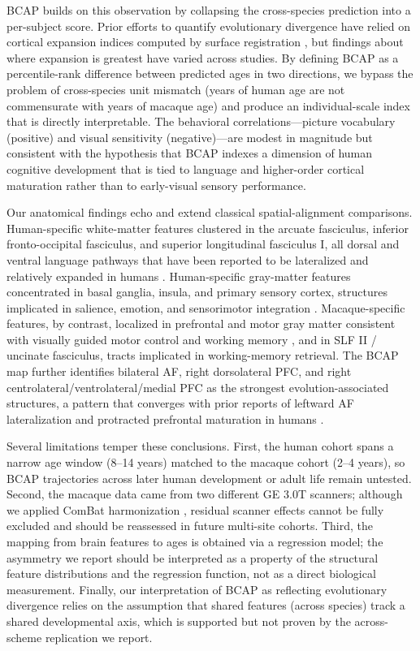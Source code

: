 \documentclass[11pt]{article}
\begin{document}
BCAP builds on this observation by collapsing the cross-species prediction into a per-subject score. Prior efforts to quantify evolutionary divergence have relied on cortical expansion indices computed by surface registration \citep{hill2010similar, smaers2019brain}, but findings about where expansion is greatest have varied across studies. By defining BCAP as a percentile-rank difference between predicted ages in two directions, we bypass the problem of cross-species unit mismatch (years of human age are not commensurate with years of macaque age) and produce an individual-scale index that is directly interpretable. The behavioral correlations---picture vocabulary (positive) and visual sensitivity (negative)---are modest in magnitude but consistent with the hypothesis that BCAP indexes a dimension of human cognitive development that is tied to language and higher-order cortical maturation rather than to early-visual sensory performance.

Our anatomical findings echo and extend classical spatial-alignment comparisons. Human-specific white-matter features clustered in the arcuate fasciculus, inferior fronto-occipital fasciculus, and superior longitudinal fasciculus I, all dorsal and ventral language pathways that have been reported to be lateralized and relatively expanded in humans \citep{rilling2008evolution, rilling2012continuity, eichert2019special, balezeau2020primate, catani2008arcuate}. Human-specific gray-matter features concentrated in basal ganglia, insula, and primary sensory cortex, structures implicated in salience, emotion, and sensorimotor integration \citep{menon2010saliency}. Macaque-specific features, by contrast, localized in prefrontal and motor gray matter consistent with visually guided motor control and working memory \citep{smaers2011primate}, and in SLF II / uncinate fasciculus, tracts implicated in working-memory retrieval. The BCAP map further identifies bilateral AF, right dorsolateral PFC, and right centrolateral/ventrolateral/medial PFC as the strongest evolution-associated structures, a pattern that converges with prior reports of leftward AF lateralization and protracted prefrontal maturation in humans \citep{miller2012prolonged, smaers2011primate, patel2019temporoparietal}.

Several limitations temper these conclusions. First, the human cohort spans a narrow age window (8--14 years) matched to the macaque cohort (2--4 years), so BCAP trajectories across later human development or adult life remain untested. Second, the macaque data came from two different GE 3.0T scanners; although we applied ComBat harmonization \citep{fortin2017harmonization_dti, johnson2007adjusting}, residual scanner effects cannot be fully excluded and should be reassessed in future multi-site cohorts. Third, the mapping from brain features to ages is obtained via a regression model; the asymmetry we report should be interpreted as a property of the structural feature distributions and the regression function, not as a direct biological measurement. Finally, our interpretation of BCAP as reflecting evolutionary divergence relies on the assumption that shared features (across species) track a shared developmental axis, which is supported but not proven by the across-scheme replication we report.
\end{document}
